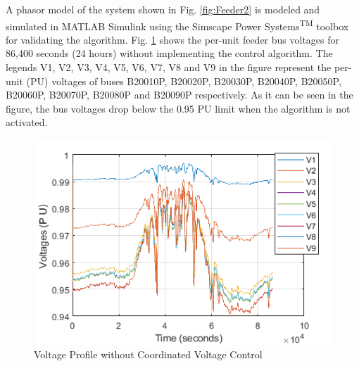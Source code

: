 A phasor model of the system shown in Fig. \ref{fig:Feeder2} is modeled and simulated  in MATLAB\textsuperscript{\textregistered} Simulink\textsuperscript{\textregistered} using the Simscape Power Systems\textsuperscript{TM} toolbox for validating the algorithm. Fig. \ref{fig:without_vvc} shows the per-unit feeder bus voltages for 86,400 seconds (24 hours) without implementing the control algorithm. The legends V1, V2, V3, V4, V5, V6, V7, V8 and V9 in the figure represent the per-unit (PU) voltages of buses B20010P, B20020P, B20030P, B20040P, B20050P, B20060P, B20070P, B20080P and B20090P respectively. As it can be seen in the figure, the bus voltages drop below the 0.95 PU limit  when the algorithm is not activated.

\begin{figure}[!h]
\centering
\includegraphics[width=\linewidth]{figs/Without_VVC.png}
\caption{Voltage Profile without Coordinated Voltage Control}
\label{fig:without_vvc}
\end{figure}

